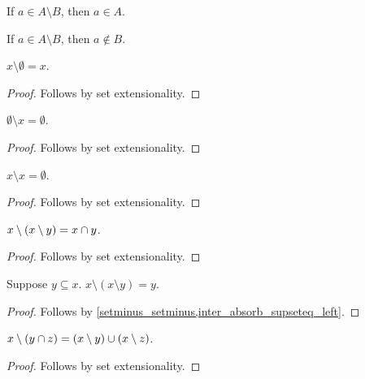 \begin{proposition}\label{setminus_elim_left}
    If $a\in A\setminus B$, then $a\in A$.
\end{proposition}

\begin{proposition}\label{setminus_elim_right}
    If $a\in A\setminus B$, then $a\notin B$.
\end{proposition}

\begin{proposition}\label{setminus_emptyset}
    $x\setminus \emptyset = x$.
\end{proposition}
\begin{proof}
    Follows by set extensionality.
\end{proof}

\begin{proposition}\label{emptyset_setminus}
    $\emptyset\setminus x = \emptyset$.
\end{proposition}
\begin{proof}
    Follows by set extensionality.
\end{proof}

\begin{proposition}\label{setminus_self}
    $x\setminus x = \emptyset$.
\end{proposition}
\begin{proof}
    Follows by set extensionality.
\end{proof}

\begin{proposition}\label{setminus_setminus}
    $x\setminus (x\setminus y) = x\cap y$.
\end{proposition}
\begin{proof}
    Follows by set extensionality.
\end{proof}

\begin{proposition}\label{double_relative_complement}
    Suppose $y\subseteq x$.
    $x\setminus (x\setminus y) = y$.
\end{proposition}
\begin{proof}
    Follows by \cref{setminus_setminus,inter_absorb_supseteq_left}.
\end{proof}

\begin{proposition}\label{setminus_inter}
    $x\setminus (y\cap z) = (x\setminus y)\cup (x\setminus z)$.
\end{proposition}
\begin{proof}
    Follows by set extensionality.
\end{proof}

